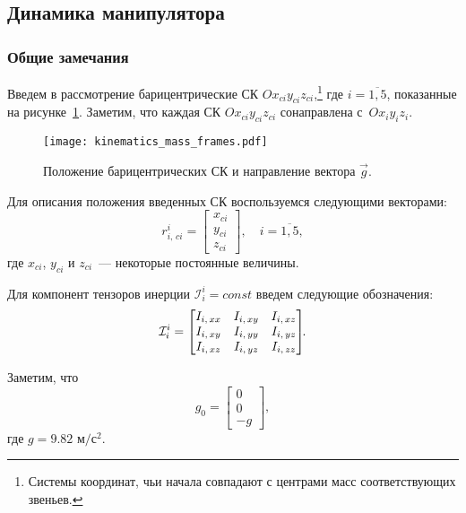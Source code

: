 \subsection{Динамика манипулятора}\label{part_dynamics}

\subsubsection{Общие замечания}
Введем в рассмотрение барицентрические СК $Ox_{ci}y_{ci}z_{ci}$\lefteqn,\footnote{Системы координат, чьи начала совпадают с центрами масс соответствующих звеньев.} где $i=\overline{1,5}$, показанные на рисунке~\ref{img_mass_frames}.
Заметим, что каждая СК $Ox_{ci}y_{ci}z_{ci}$ сонаправлена с~$Ox_iy_iz_i$.

\begin{figure}[h!]
	\centering\texttt{[image: kinematics\_mass\_frames.pdf]}
	\caption{Положение барицентрических СК и направление вектора $\vec{g}$.}
	\label{img_mass_frames}
\end{figure}

Для описания положения введенных СК воспользуемся следующими векторами:
\begin{equation}
    r^i_{i,\,ci} =
    \begin{bmatrix}
        x_{ci} \\ y_{ci} \\ z_{ci}
    \end{bmatrix}\!\!,\quad i = \overline{1,5},
\end{equation}
где $x_{ci}$, $y_{ci}$ и $z_{ci}$~--- некоторые постоянные величины.

Для компонент тензоров инерции $\mathcal{I}^{i}_i = const$ введем следующие обозначения:
\begin{equation}
    \mathcal{I}^{i}_i =
    \begin{bmatrix}
        I_{i,\,xx} & I_{i,\,xy} & I_{i,\,xz} \\
        I_{i,\,xy} & I_{i,\,yy} & I_{i,\,yz} \\
        I_{i,\,xz} & I_{i,\,yz} & I_{i,\,zz}
    \end{bmatrix}\!\!\ldotp
\end{equation}

Заметим, что
\begin{equation}
    g_0 =
    \begin{bmatrix}
        0 \\ 0 \\ -g
    \end{bmatrix}\!\!,
\end{equation}
где $g=9.82\text{ м}/\text{с}^2$.

